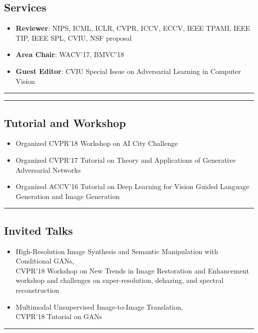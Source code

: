 \documentclass[10pt,letterpaper]{article}
\begin{document}
\subsection*{Services}
\begin{itemize}
	\item {\bf Reviewer}: NIPS, ICML, ICLR, CVPR, ICCV, ECCV, IEEE TPAMI, IEEE TIP, IEEE SPL, CVIU, NSF proposal\vspace{-2mm}
	\item {\bf Area Chair}: WACV'17, BMVC'18\vspace{-2mm}
	\item {\bf Guest Editor}: CVIU Special Issue on Adversarial Learning in Computer Vision
\end{itemize}
\hrule
\clearpage

\hrule
\subsection*{Tutorial and Workshop}
\begin{itemize}
	\item Organized CVPR'18 Workshop on AI City Challenge\vspace{-2mm}	
	\item Organized CVPR'17 Tutorial on Theory and Applications of Generative Adversarial Networks\vspace{-2mm}
	\item Organized ACCV'16 Tutorial on Deep Learning for Vision Guided Language Generation and Image Generation \vspace{-2mm}	
\end{itemize}
\hrule
\subsection*{Invited Talks}
\begin{itemize}
	\item High-Resolution Image Synthesis and Semantic Manipulation with Conditional GANs,\\
	CVPR'18 Workshop on New Trends in Image Restoration and Enhancement workshop and challenges on super-resolution, dehazing, and spectral reconstruction\vspace{-2mm}
	\item Multimodal Unsupervised Image-to-Image Translation,\\
	CVPR'18 Tutorial on GANs\vspace{-2mm}	
\end{itemize}
\hrule
\end{document}
